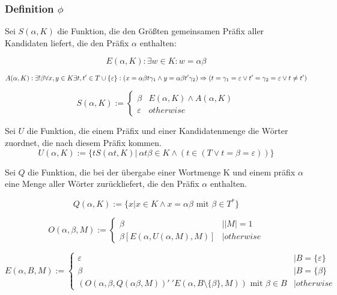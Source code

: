 \documentclass[]{article}
\begin{document}
\subsubsection*{Definition $\phi$}



Sei $S(\alpha,K)$ die Funktion, die den Größten gemeinsamen Präfix aller Kandidaten liefert, die den Präfix $\alpha$ enthalten:

\[ E(\alpha, K) : \exists w\in K: w=\alpha\beta \] 

\[ 
  A(\alpha, K): 
    \exists ! \beta \forall x, y\in K\exists t, t' \in T\cup\{\varepsilon\}: \\
    ( x = \alpha \beta t \gamma_1 \land y = \alpha \beta t' \gamma_2 ) \Rightarrow 
    ( t = \gamma_1 = \varepsilon \lor t' = \gamma_2 = \varepsilon \lor t \neq t' )
\] 

\[
  S( \alpha, K ) := 
  \begin{cases}
    \beta & E(\alpha,K) \land A(\alpha,K) \\
    \varepsilon & otherwise
  \end{cases}
\] 
    
%   

Sei $U$ die Funktion, die einem Präfix und einer Kandidatenmenge die Wörter zuordnet, die nach diesem Präfix kommen.
\[ U( \alpha, K ) := \{t S(\alpha t, K) |\ \alpha t \beta \in K \land ( t\in (T \lor t=\beta=\varepsilon )) \} \] 

Sei $Q$ die Funktion, die bei der übergabe einer Wortmenge K und einem präfix $\alpha$ eine Menge aller Wörter zurückliefert, die den Präfix $\alpha$ enthalten.

\[ Q(\alpha, K):= \{x |x\in K\land x=\alpha\beta\text{ mit } \beta \in T^*\} \] 

\[ 
  O(\alpha, \beta, M):=
  \begin{cases}
    \beta & | |M| = 1 \\
    \beta [E(\alpha, U( \alpha, M ), M)] &|otherwise
  \end{cases}
\] 

\[ 
  E( \alpha, B, M ) := 
  \begin{cases}
    \varepsilon & |B =  \{ \varepsilon \}\\
    \beta & |B =  \{ \beta \}\\
    (O(\alpha, \beta, Q(\alpha\beta, M))'\ ' E(\alpha, B\setminus \{\beta\}, M))\text{ mit }\beta\in B &| otherwise
  \end{cases}
\] 
\end{document}

